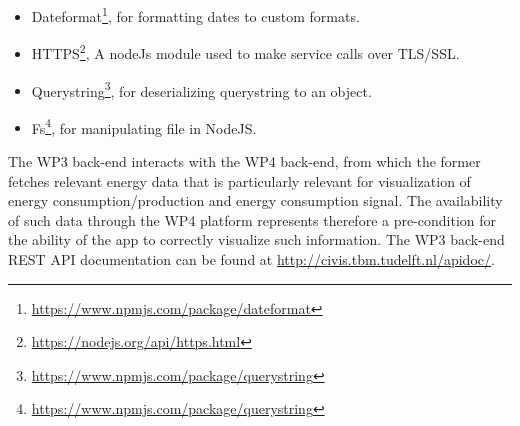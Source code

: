 \begin{itemize}
\item Dateformat\footnote{\url{https://www.npmjs.com/package/dateformat}}, for formatting dates to custom formats. 

\item HTTPS\footnote{\url{https://nodejs.org/api/https.html}}, A nodeJs module used to make service calls over TLS/SSL. 

\item Querystring\footnote{\url{https://www.npmjs.com/package/querystring}}, for deserializing querystring to an object. 

\item Fs\footnote{\url{https://www.npmjs.com/package/querystring}}, for manipulating file in NodeJS. 
\end{itemize}

% 
The WP3 back-end interacts with the WP4 back-end, from which the former fetches relevant energy data that is particularly relevant for visualization of energy consumption/production and energy consumption signal. The availability of such data through the WP4 platform represents therefore a pre-condition for the ability of the app to correctly visualize such information. The WP3 back-end REST API documentation can be found at {\footnotesize\url{http://civis.tbm.tudelft.nl/apidoc/}}. 
% 

